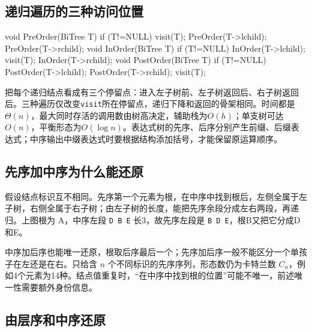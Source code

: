\subsection{递归遍历的三种访问位置}\label{DS05-order-code}

\par\medskip\noindent\begin{minipage}{\linewidth}
\begin{codeblock}[language=C++]
void PreOrder(BiTree T) {
    if (T!=NULL) {
        visit(T);
        PreOrder(T->lchild);
        PreOrder(T->rchild);
    }
}
void InOrder(BiTree T) {
    if (T!=NULL) {
        InOrder(T->lchild);
        visit(T);
        InOrder(T->rchild);
    }
}
void PostOrder(BiTree T) {
    if (T!=NULL) {
        PostOrder(T->lchild);
        PostOrder(T->rchild);
        visit(T);
    }
}
\end{codeblock}
\end{minipage}\par\medskip

把每个递归结点看成有三个停留点：进入左子树前、左子树返回后、右子树返回后。三种遍历仅改变\texttt{visit}所在停留点，递归下降和返回的骨架相同。时间都是\(\Theta(n)\)，最大同时存活的调用数由树高决定，辅助栈为\(O(h)\)；单支树可达\(O(n)\)，平衡形态为\(O(\log n)\)。表达式树的先序、后序分别产生前缀、后缀表达式；中序输出中缀表达式时要根据结构添加括号，才能保留原运算顺序。

\subsection{先序加中序为什么能还原}\label{ux5148ux5e8fux52a0ux4e2dux5e8fux4e3aux4ec0ux4e48ux80fdux8fd8ux539f}

假设结点标识互不相同。先序第一个元素为根，在中序中找到根后，左侧全属于左子树，右侧全属于右子树；由左子树的长度，能把先序余段分成左右两段，再递归。上图根为 A，中序左段 \texttt{D B E} 长3，故先序左段是 \texttt{B D E}，根B又把它分成D和E。

中序加后序也能唯一还原，根取后序最后一个；先序加后序一般不能区分一个单孩子在左还是在右。只给含 \(n\) 个不同标识的先序序列，形态数仍为卡特兰数 \(C_n\)，例如4个元素为14种。结点值重复时，``在中序中找到根的位置''可能不唯一，前述唯一性需要额外身份信息。

\subsection{由层序和中序还原}\label{DS05-rebuild}

